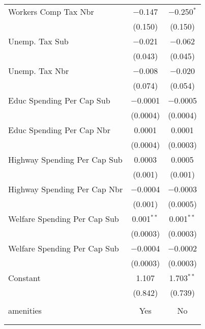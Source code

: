 \begin{table}[!htbp]
\begin{tabular}{@{\extracolsep{5pt}}lcc}
  Workers Comp Tax Nbr & $-$0.147 & $-$0.250$^{*}$ \\ 
  & (0.150) & (0.150) \\ 
  Unemp. Tax Sub & $-$0.021 & $-$0.062 \\ 
  & (0.043) & (0.045) \\ 
  Unemp. Tax Nbr & $-$0.008 & $-$0.020 \\ 
  & (0.074) & (0.054) \\ 
  Educ Spending Per Cap Sub & $-$0.0001 & $-$0.0005 \\ 
  & (0.0004) & (0.0004) \\ 
  Educ Spending Per Cap Nbr & 0.0001 & 0.0001 \\ 
  & (0.0004) & (0.0003) \\ 
  Highway Spending Per Cap Sub & 0.0003 & 0.0005 \\ 
  & (0.001) & (0.001) \\ 
  Highway Spending Per Cap Nbr & $-$0.0004 & $-$0.0003 \\ 
  & (0.001) & (0.0005) \\ 
  Welfare Spending Per Cap Sub & 0.001$^{**}$ & 0.001$^{**}$ \\ 
  & (0.0003) & (0.0003) \\ 
  Welfare Spending Per Cap Sub & $-$0.0004 & $-$0.0002 \\ 
  & (0.0003) & (0.0003) \\ 
  Constant & 1.107 & 1.703$^{**}$ \\ 
  & (0.842) & (0.739) \\ 
 \hline \\[-1.8ex] 
amenities & Yes & No \\ 
\hline \\[-1.8ex] 
\hline 
\hline \\[-1.8ex] 
\end{tabular} 
\end{table} 
